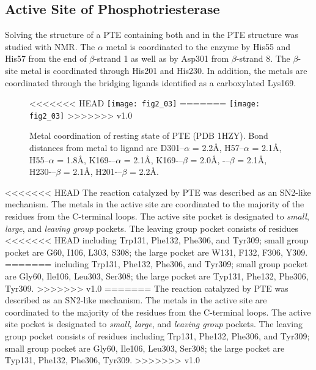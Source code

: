 \begin{refsection}
\subsection{Active Site of Phosphotriesterase}

Solving the structure of a PTE containing both  and
 in the PTE structure was studied with NMR\cite{Benning2001a}. The
$\alpha$ metal is coordinated to the enzyme by His55 and His57 from the
end of $\beta$-strand 1 as well as by Asp301 from $\beta$-strand 8. The
$\beta$-site metal is coordinated through His201 and His230. In addition, the
metals are coordinated through the bridging ligands identified as a
carboxylated Lys169.

\begin{figure}[h!] 
    \centering 
<<<<<<< HEAD
    \texttt{[image: fig2\_03]}
=======
    \texttt{[image: fig2\_03]}
>>>>>>> v1.0
    \caption[Metal
        coordination of resting state of PTE (PDB 1HZY). Bond distances from
        metal to ligand are D301--$\alpha$ = 2.2\AA, H57--$\alpha$ = 2.1\AA,
        H55--$\alpha$ = 1.8\AA, K169-–$\alpha$ = 2.1\AA, K169-–$\beta$ =
        2.0\AA, -–$\beta$ = 2.1\AA, H230-–$\beta$ = 2.1\AA,
    H201-–$\beta$ = 2.2\AA.]{Metal coordination of resting state of PTE (PDB
        1HZY). Bond distances from metal to ligand are D301--$\alpha$ = 2.2\AA,
        H57--$\alpha$ = 2.1\AA, H55--$\alpha$ = 1.8\AA, K169-–$\alpha$ =
        2.1\AA, K169-–$\beta$ = 2.0\AA,
    -–$\beta$ = 2.1\AA, H230-–$\beta$ = 2.1\AA, H201-–$\beta$ = 2.2\AA.} 
    \label{fig:pte-active-site-chap2}
\end{figure}

<<<<<<< HEAD
The reaction catalyzed by PTE was described as an SN2-like mechanism. The metals in the
active site are coordinated to the majority of the residues from the C-terminal
loops. The active site pocket is designated to \emph{small}, \emph{large}, and
\emph{leaving group} pockets. The leaving group pocket consists of residues
<<<<<<< HEAD
including Trp131, Phe132, Phe306, and Tyr309; small group pocket are G60, I106,
L303, S308; the large pocket are W131, F132, F306, Y309.
=======
including Trp131, Phe132, Phe306, and Tyr309; small group pocket are Gly60, Ile106,
Leu303, Ser308; the large pocket are Typ131, Phe132, Phe306, Tyr309.
>>>>>>> v1.0
=======
The reaction catalyzed by PTE was described as an SN2-like mechanism. The
metals in the active site are coordinated to the majority of the residues from
the C-terminal loops. The active site pocket is designated to \emph{small},
\emph{large}, and \emph{leaving group} pockets. The leaving group pocket
consists of residues including Trp131, Phe132, Phe306, and Tyr309; small group
pocket are Gly60, Ile106, Leu303, Ser308; the large pocket are Typ131, Phe132,
Phe306, Tyr309.
>>>>>>> v1.0


\end{refsection}
